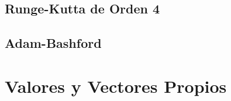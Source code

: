 \documentclass[10pt,a4paper]{article}
\begin{document}
	
	
	\subsection{Runge-Kutta de Orden 4}

	
	
	\subsection{Adam-Bashford}
	
	
	
	\section{Valores y Vectores Propios}
	
\end{document}
